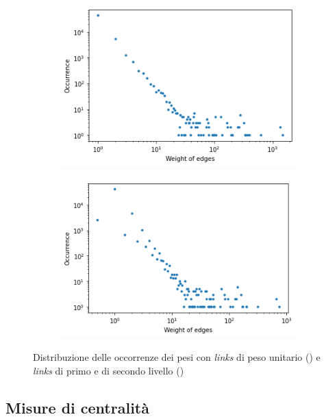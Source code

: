     \begin{figure}[b]
        \centering
        \begin{subfigure}{.4\textwidth}
            \centering
            \caption{}
            \includegraphics[scale=.4]{6_Network_resilience/equal_weights.png}
            \label{fig:equal_weights}
        \end{subfigure}
        \centering
        \begin{subfigure}{.4\textwidth}
            \centering
            \caption{}
            \includegraphics[scale=.4] {6_Network_resilience/direct_undirect_weights.png}
            \label{fig:direct_undirect_weights}
        \end{subfigure}
        \caption{Distribuzione delle occorrenze dei pesi con \textit{links} di peso unitario () e \textit{links} di primo e di secondo livello ()}
        \label{fig:weights}
    \end{figure}

    \subsection{Misure di centralità}
    
